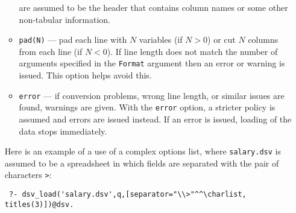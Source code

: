 \begin{itemize}
\begin{itemize}
  are assumed to be the header that contains column names or some other
  non-tabular information.
\item \texttt{pad(N)} --- pad each line with $N$ variables (if $N>0$) or
  cut $N$ columns from each line  (if $N<0$).
  If line length does not match the number of arguments specified in the
  \texttt{Format} argument then an error or warning is issued. This option
  helps avoid this.
\item \texttt{error} --- if conversion problems, wrong line length,
  or similar issues are
  found, warnings are given. With the \texttt{error} option, a stricter
  policy is assumed and errors are issued instead. If an error is issued,
  loading of the data stops immediately.  
\end{itemize}
Here is an example of a use of a complex options list, where
\texttt{salary.dsv} is assumed to be a spreadsheet in which fields are
separated with the pair of characters \texttt{\bs{}>}:  
\begin{verbatim}
 ?- dsv_load('salary.dsv',q,[separator="\\>"^^\charlist, titles(3)])@dsv.
\end{verbatim}
\end{itemize}

